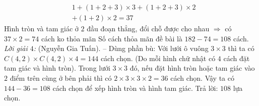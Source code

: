 \begin{multicols}{2}
\begin{align*}
		&1 + (1+2+3) \times 3 + (1+2+3) \times 2 \\
		&+ (1+2) \times 2 = 37
	\end{align*}
	Hình tròn và tam giác ở $2$ đầu đoạn thẳng, đổi chỗ được cho nhau $\Rightarrow$ có $37 \times 2 = 74$ cách ko thỏa mãn
	\vskip 0.1cm
	Số cách thỏa mãn đề bài là $182 - 74 = 108$ cách.
	\vskip 0.1cm
	\textit{Lời giải $4$:} (Nguyễn Gia Tuấn). -- Dùng phần bù:
	\vskip 0.1cm
	Với lưới ô vuông $3 \times 3$ thì ta có $C(4,2)\times C(4,2)\times 4 = 144$ cách chọn. (Do mỗi hình chữ nhật có $4$ cách đặt tam giác và hình tròn).
	\vskip 0.1cm
	Trong lưới $3 \times 3$ đó, nếu đặt hình tròn hoặc tam giác vào $2$ điểm trên cùng ở bên phải thì có $2 \times 3 \times  3 \times 2 = 36$ cách chọn.
	\vskip 0.1cm
	Vậy ta có $144 - 36 = 108$ cách chọn để xếp hình tròn và hình tam giác.
	\vskip 0.1cm
	Trả lời: $108$ lựa chọn.
\end{multicols}
\newpage
\begingroup
{}  
